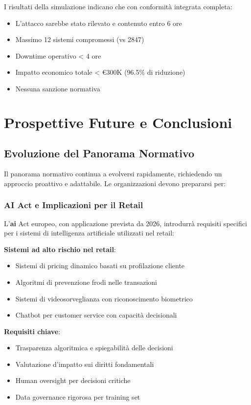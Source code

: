 I risultati della simulazione indicano che con conformità integrata completa:
\begin{itemize}
    \item L'attacco sarebbe stato rilevato e contenuto entro 6 ore
    \item Massimo 12 sistemi compromessi (vs 2847)
    \item Downtime operativo < 4 ore
    \item Impatto economico totale < €300K (96.5\% di riduzione)
    \item Nessuna sanzione normativa
\end{itemize}

\section{Prospettive Future e Conclusioni}
\label{sec:4.9_conclusioni}

\subsection{Evoluzione del Panorama Normativo}
\label{subsec:4.9.1_evoluzione}

Il panorama normativo continua a evolversi rapidamente, richiedendo un approccio proattivo e adattabile. Le organizzazioni devono prepararsi per:

\subsubsection{AI Act e Implicazioni per il Retail}

L'\textbf{\gls{ai}} Act europeo, con applicazione prevista da 2026, introdurrà requisiti specifici per i sistemi di intelligenza artificiale utilizzati nel retail:

\textbf{Sistemi ad alto rischio nel retail}:
\begin{itemize}
    \item Sistemi di pricing dinamico basati su profilazione cliente
    \item Algoritmi di prevenzione frodi nelle transazioni
    \item Sistemi di videosorveglianza con riconoscimento biometrico
    \item Chatbot per customer service con capacità decisionali
\end{itemize}

\textbf{Requisiti chiave}:
\begin{itemize}
    \item Trasparenza algoritmica e spiegabilità delle decisioni
    \item Valutazione d'impatto sui diritti fondamentali
    \item Human oversight per decisioni critiche
    \item Data governance rigorosa per training set
\end{itemize}

